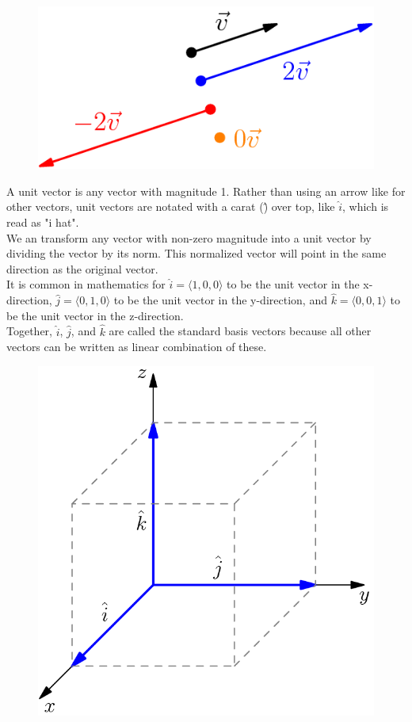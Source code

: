 \begin{figure}[h]
	\centering
	\includegraphics[scale=0.5]{Images/backgroundReview/ScalarMultiples}
\end{figure}

\noindent
A unit vector is any vector with magnitude 1. Rather than using an arrow like for other vectors, unit vectors are notated with a carat (\^) over top, like $\hat{i}$, which is read as "i hat".\\
We an transform any vector with non-zero magnitude into a unit vector by dividing the vector by its norm. This normalized vector will point in the same direction as the original vector.\\

\noindent
It is common in mathematics for $\hat{i}=\langle 1,0,0 \rangle$ to be the unit vector in the x-direction, $\hat{j}=\langle 0,1,0 \rangle$ to be the unit vector in the y-direction, and $\hat{k}=\langle 0,0,1 \rangle$ to be the unit vector in the z-direction.\\
Together, $\hat{i}$, $\hat{j}$, and $\hat{k}$ are called the standard basis vectors because all other vectors can be written as linear combination of these.

\begin{figure}[h]
	\centering
	\includegraphics[scale=0.33]{Images/backgroundReview/UnitVectors}
\end{figure}


